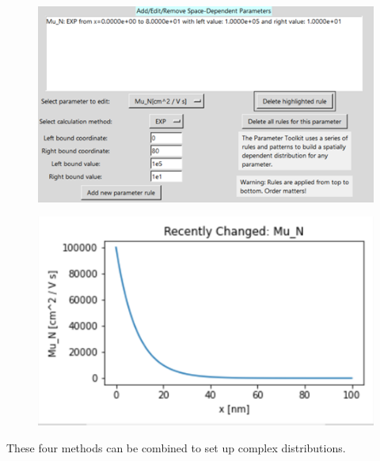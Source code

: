 \documentclass[11pt,letterpaper,titlepage]{article}
\begin{document}
		\begin{figure}[H]
			\label{fig:ptoolkit_exp}
			\centering
			\includegraphics[scale=1]{"ptoolkit_exp"}
		\end{figure}
		\begin{figure}[H]
			\label{fig:ptoolkit_exp_plot}
			\centering
			\includegraphics[scale=1]{"ptoolkit_exp_plot"}
		\end{figure}
		
		\par These four methods can be combined to set up complex distributions.
		
\end{document}
